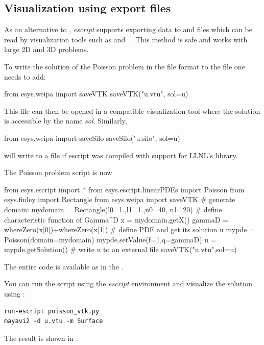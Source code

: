 \subsection{Visualization using export files}

As an alternative to \MATPLOTLIB, {\it escript} supports exporting data to
\VTK and \SILO files which can be read by visualization tools such as
\mayavi\cite{mayavi} and \VisIt~\cite{VisIt}. This method is \MPI safe and
works with large 2D and 3D problems.

To write the solution  of the Poisson problem in the \VTK file format
to the file  one needs to add:
\begin{python}
  from esys.weipa import saveVTK
  saveVTK("u.vtu", sol=u)
\end{python}
This file can then be opened in a \VTK compatible visualization tool where the
solution is accessible by the name {\it sol}. Similarly,
\begin{python}
  from esys.weipa import saveSilo
  saveSilo("u.silo", sol=u)
\end{python}
will write  to a \SILO file if escript was compiled with support for
LLNL's \SILO library.

The Poisson problem script is now 
\begin{python}
  from esys.escript import *
  from esys.escript.linearPDEs import Poisson
  from esys.finley import Rectangle
  from esys.weipa import saveVTK
  # generate domain:
  mydomain = Rectangle(l0=1.,l1=1.,n0=40, n1=20)
  # define characteristic function of Gamma^D
  x = mydomain.getX()
  gammaD = whereZero(x[0])+whereZero(x[1])
  # define PDE and get its solution u
  mypde = Poisson(domain=mydomain)
  mypde.setValue(f=1,q=gammaD)
  u = mypde.getSolution()
  # write u to an external file
  saveVTK("u.vtu",sol=u)
\end{python}
The entire code is available as  in the \ExampleDirectory.

You can run the script using the {\it escript} environment and visualize the
solution using \mayavi:
\begin{verbatim}
run-escript poisson_vtk.py
mayavi2 -d u.vtu -m Surface
\end{verbatim}
The result is shown in .

